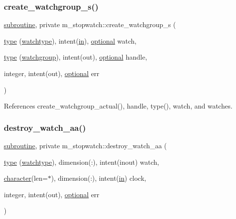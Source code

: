 \subsubsection{\texorpdfstring{create\+\_\+watchgroup\+\_\+s()}{create\_watchgroup\_s()}}
{\footnotesize\ttfamily \hyperlink{M__stopwatch_83_8txt_acfbcff50169d691ff02d4a123ed70482}{subroutine}, private m\+\_\+stopwatch\+::create\+\_\+watchgroup\+\_\+s (\begin{DoxyParamCaption}\item[{\hyperlink{stop__watch_83_8txt_a70f0ead91c32e25323c03265aa302c1c}{type} (\hyperlink{structm__stopwatch_1_1watchtype}{watchtype}), intent(\hyperlink{M__journal_83_8txt_afce72651d1eed785a2132bee863b2f38}{in}), \hyperlink{option__stopwatch_83_8txt_aa4ece75e7acf58a4843f70fe18c3ade5}{optional}}]{watch,  }\item[{\hyperlink{stop__watch_83_8txt_a70f0ead91c32e25323c03265aa302c1c}{type} (\hyperlink{structm__stopwatch_1_1watchgroup}{watchgroup}), intent(out), \hyperlink{option__stopwatch_83_8txt_aa4ece75e7acf58a4843f70fe18c3ade5}{optional}}]{handle,  }\item[{integer, intent(out), \hyperlink{option__stopwatch_83_8txt_aa4ece75e7acf58a4843f70fe18c3ade5}{optional}}]{err }\end{DoxyParamCaption})\hspace{0.3cm}{\ttfamily [private]}}



References create\+\_\+watchgroup\+\_\+actual(), handle, type(), watch, and watches.

\mbox{\label{namespacem__stopwatch_a797f3a482e663407c89b981f41d7349b}} 
\subsubsection{\texorpdfstring{destroy\+\_\+watch\+\_\+aa()}{destroy\_watch\_aa()}}
{\footnotesize\ttfamily \hyperlink{M__stopwatch_83_8txt_acfbcff50169d691ff02d4a123ed70482}{subroutine}, private m\+\_\+stopwatch\+::destroy\+\_\+watch\+\_\+aa (\begin{DoxyParamCaption}\item[{\hyperlink{stop__watch_83_8txt_a70f0ead91c32e25323c03265aa302c1c}{type} (\hyperlink{structm__stopwatch_1_1watchtype}{watchtype}), dimension(\+:), intent(inout)}]{watch,  }\item[{\hyperlink{option__stopwatch_83_8txt_abd4b21fbbd175834027b5224bfe97e66}{character}(len=$\ast$), dimension(\+:), intent(\hyperlink{M__journal_83_8txt_afce72651d1eed785a2132bee863b2f38}{in})}]{clock,  }\item[{integer, intent(out), \hyperlink{option__stopwatch_83_8txt_aa4ece75e7acf58a4843f70fe18c3ade5}{optional}}]{err }\end{DoxyParamCaption})\hspace{0.3cm}{\ttfamily [private]}}




